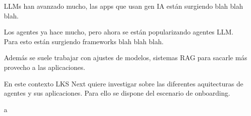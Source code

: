 LLMs han avanzado mucho, las apps que usan gen IA están surgiendo blah blah blah.

Los agentes ya hace mucho, pero ahora se están popularizando agentes LLM. Para esto están surgiendo frameworks blah blah blah.

Además se suele trabajar con ajustes de modelos, sistemas RAG para sacarle más provecho a las aplicaciones.

En este contexto LKS Next quiere investigar sobre las diferentes aquitecturas de agentes y sus aplicaciones. Para ello se dispone del escenario de onboarding.

a
